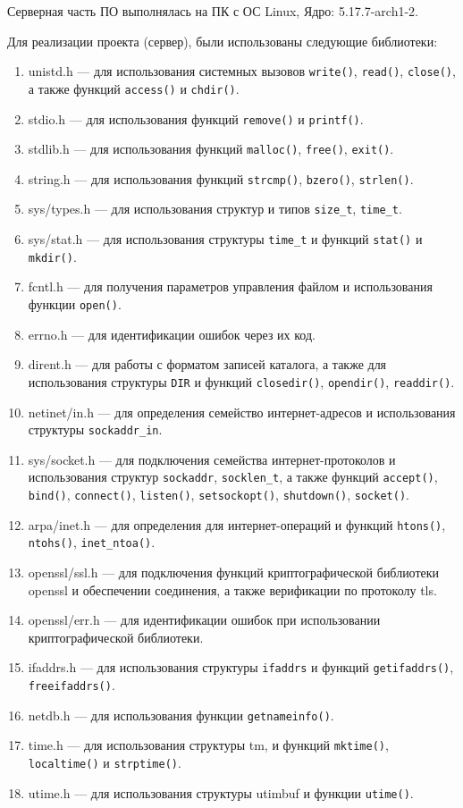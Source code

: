 Серверная часть ПО выполнялась на ПК с ОС Linux, Ядро: 5.17.7-arch1-2.

Для реализации проекта (сервер), были использованы следующие библиотеки:
\begin{enumerate}
	\item unistd.h --- для использования системных вызовов \verb|write()|, \verb|read()|, \verb|close()|, а также функций \verb|access()| и \verb|chdir()|.
	\item stdio.h --- для использования функций \verb|remove()| и \verb|printf()|.
	\item stdlib.h --- для использования функций \verb|malloc()|, \verb|free()|, \verb|exit()|.
	\item string.h --- для использования функций \verb|strcmp()|, \verb|bzero()|, \verb|strlen()|.
	\item sys/types.h --- для использования структур и типов \verb|size_t|, \verb|time_t|.
	\item sys/stat.h --- для использования структуры \verb|time_t| и функций \verb|stat()| и \verb|mkdir()|.
	\item fcntl.h --- для получения параметров управления файлом и использования функции \verb|open()|.
	\item errno.h --- для идентификации ошибок через их код.
	\item dirent.h --- для  работы с форматом записей каталога, а также  для использования структуры \verb|DIR| и функций  \verb|closedir()|, \verb|opendir()|, \verb|readdir()|.
	\item netinet/in.h --- для определения семейство интернет-адресов и использования структуры \verb|sockaddr_in|.
	\item sys/socket.h --- для подключения семейства интернет-протоколов и использования структур  \verb|sockaddr|, \verb|socklen_t|, а также функций \verb|accept()|, \verb|bind()|, \verb|connect()|, \verb|listen()|, \verb|setsockopt()|, \verb|shutdown()|, \verb|socket()|.
	\item arpa/inet.h --- для определения для интернет-операций и функций \verb|htons()|, \verb|ntohs()|, \verb|inet_ntoa()|.
	\item openssl/ssl.h --- для подключения функций криптографической библиотеки openssl и обеспечении соединения, а также верификации по протоколу tls.  
	\item openssl/err.h --- для идентификации ошибок при использовании криптографической библиотеки.
	\item ifaddrs.h --- для использования структуры \verb|ifaddrs| и функций \verb|getifaddrs()|, \verb|freeifaddrs()|.
	\item netdb.h --- для использования функции \verb|getnameinfo()|.
	\item time.h --- для использования структуры tm, и функций \verb|mktime()|, \verb|localtime()| и \verb|strptime()|.
	\item utime.h --- для использования структуры utimbuf  и функции \verb|utime()|.
\end{enumerate}

